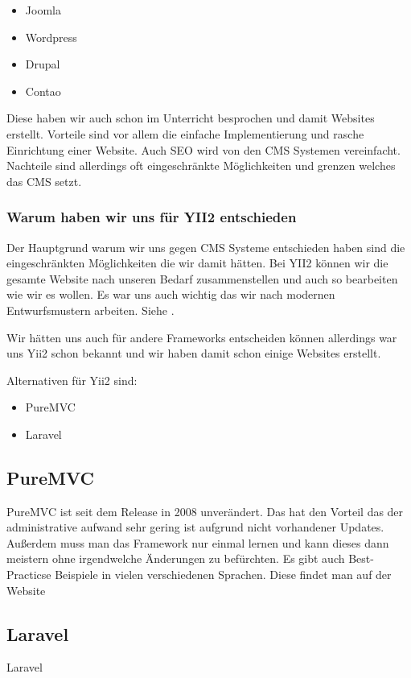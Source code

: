 \begin{itemize}
\item Joomla
\item Wordpress
\item Drupal
\item Contao
\end{itemize}

Diese haben wir auch schon im Unterricht besprochen und damit Websites erstellt. Vorteile sind vor allem die einfache Implementierung und rasche Einrichtung einer Website. Auch SEO wird von den CMS Systemen vereinfacht. Nachteile sind allerdings oft eingeschränkte Möglichkeiten und grenzen welches das CMS setzt.

\subsubsection{Warum haben wir uns für YII2 entschieden}

Der Hauptgrund warum wir uns gegen CMS Systeme entschieden haben sind die eingeschränkten Möglichkeiten die wir damit hätten. Bei YII2 können wir die gesamte Website nach unseren Bedarf zusammenstellen und auch so bearbeiten wie wir es wollen. Es war uns auch wichtig das wir nach modernen Entwurfsmustern arbeiten. Siehe .

Wir hätten uns auch für andere Frameworks entscheiden können allerdings war uns Yii2 schon bekannt und wir haben damit schon einige Websites erstellt.

Alternativen für Yii2 sind:

\begin{itemize}
	\item PureMVC
	\item Laravel
\end{itemize}

\subsection{PureMVC}
PureMVC ist seit dem Release in 2008 unverändert. Das hat den Vorteil das der administrative aufwand sehr gering ist aufgrund nicht vorhandener Updates. Außerdem muss man das Framework nur einmal lernen und kann dieses dann meistern ohne irgendwelche Änderungen zu befürchten.
Es gibt auch Best-Practicse Beispiele in vielen verschiedenen Sprachen. Diese findet man auf der Website \cite{Pure_MVC}

\subsection{Laravel}
Laravel


